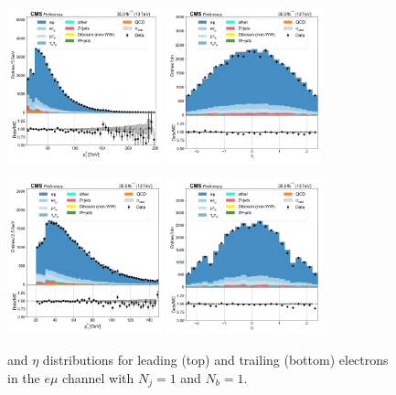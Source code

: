 \begin{figure}[htb!]
    \centering
    \includegraphics[width=0.4\textwidth]{chapters/Appendix/sectionPlots/figures/data_mc_overlays/emu_2016_cat_eq1_eq1_a_signal_linear_lepton_lepton1_pt}
    \includegraphics[width=0.4\textwidth]{chapters/Appendix/sectionPlots/figures/data_mc_overlays/emu_2016_cat_eq1_eq1_a_signal_linear_lepton_lepton1_eta}

    \includegraphics[width=0.4\textwidth]{chapters/Appendix/sectionPlots/figures/data_mc_overlays/emu_2016_cat_eq1_eq1_a_signal_linear_lepton_lepton2_pt}
    \includegraphics[width=0.4\textwidth]{chapters/Appendix/sectionPlots/figures/data_mc_overlays/emu_2016_cat_eq1_eq1_a_signal_linear_lepton_lepton2_eta}
    \caption{\pt and $\eta$ distributions for leading (top) and trailing
        (bottom) electrons in the $e\mu$ channel with $N_{j} = 1$ and
        $N_{b} = 1$.}
    \label{fig:emu_3_kinematic}
\end{figure}

